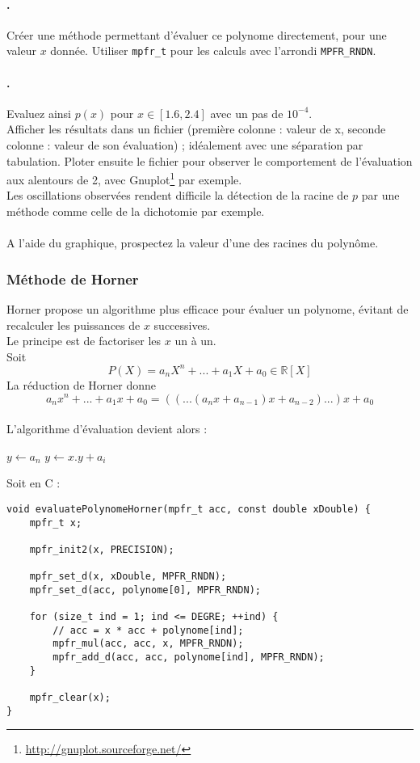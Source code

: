 \documentclass[a4paper,11pt]{exam}
\begin{document}
\paragraph{\theenumii.} Créer une méthode permettant d'évaluer ce polynome directement, pour une valeur $x$ donnée. Utiliser \verb=mpfr_t= pour les calculs avec l'arrondi \verb=MPFR_RNDN=.

\paragraph{\theenumii.} Evaluez ainsi $p(x)$ pour $x \in \left[ 1.6,2.4 \right]$ avec un pas de $10^{-4}$. \\
Afficher les résultats dans un fichier (première colonne : valeur de x, seconde colonne : valeur de son évaluation) ; idéalement avec une séparation par tabulation. Ploter ensuite le fichier pour observer le comportement de l'évaluation aux alentours de 2, avec Gnuplot\footnote{\url{http://gnuplot.sourceforge.net/}} par exemple.\\
Les oscillations observées rendent difficile la détection de la racine de $p$ par une méthode comme celle de la dichotomie par exemple.\\
\\A l'aide du graphique, prospectez la valeur d'une des racines du polynôme.

\subsubsection{Méthode de Horner}
\setcounter{enumii}{1}
Horner propose un algorithme plus efficace pour évaluer un polynome, évitant de recalculer les puissances de $x$ successives.\\
Le principe est de factoriser les $x$ un à un. \\
Soit \[ P\left(X\right) = a_{n}X^{n}+...+a_{1}X +  a_{0} \in  \mathbb{R}\left[ X\right] \]
La réduction de Horner donne
\[a_{n}x^{n}+...+a_{1}x + a_{0} = ((...(a_{n}x+a_{n-1})x+a_{n-2})...)x+a_{0} \]
\\ 
L'algorithme d'évaluation devient alors :\\
\begin{algorithmic}
 	\State $y\gets a_{n}$
 		\State $y\gets x.y+a_{i}$
 \EndFor
\end{algorithmic}

Soit en C :
\begin{lstlisting}
void evaluatePolynomeHorner(mpfr_t acc, const double xDouble) {
	mpfr_t x;

	mpfr_init2(x, PRECISION);

	mpfr_set_d(x, xDouble, MPFR_RNDN);
	mpfr_set_d(acc, polynome[0], MPFR_RNDN);

	for (size_t ind = 1; ind <= DEGRE; ++ind) {
		// acc = x * acc + polynome[ind];
		mpfr_mul(acc, acc, x, MPFR_RNDN);
		mpfr_add_d(acc, acc, polynome[ind], MPFR_RNDN);
	}

	mpfr_clear(x);
}
\end{lstlisting}
\end{document}
